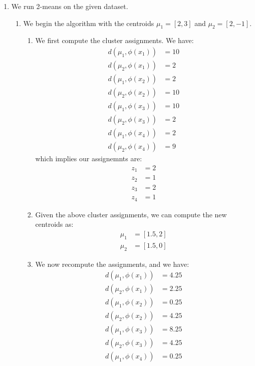 \documentclass[12pt]{article}
\begin{document}
\begin{enumerate}[label=(\alph*)]
  \item We run 2-means on the given dataset.
    \begin{enumerate}
      \item We begin the algorithm with the centroids $\mu_1 = [2,3]$ and $\mu_2 = [2,-1]$.
      \begin{enumerate}[label=(\arabic*)]
        \item We first compute the cluster assignments. We have:
        \begin{align*}
          d(\mu_1, \phi(x_1)) &= 10\\
          d(\mu_2, \phi(x_1)) &= 2 \\
          d(\mu_1, \phi(x_2)) &= 2 \\
          d(\mu_2, \phi(x_2)) &= 10 \\
          d(\mu_1, \phi(x_3)) &= 10\\
          d(\mu_2, \phi(x_3)) &= 2 \\
          d(\mu_1, \phi(x_4)) &= 2 \\
          d(\mu_2, \phi(x_4)) &= 9
        \end{align*}
        which implies our assignemnts are:
        \begin{align*}
          z_1 &= 2 \\
          z_2 &= 1 \\
          z_3 &= 2 \\
          z_4 &= 1
        \end{align*}
      \item Given the above cluster assignments, we can compute the new centroids as:
      \begin{align*}
        \mu_1 &= [1.5, 2] \\
        \mu_2 &= [1.5, 0]
      \end{align*}
      \item We now recompute the assignments, and we have:
      \begin{align*}
        d(\mu_1, \phi(x_1)) &= 4.25\\
        d(\mu_2, \phi(x_1)) &= 2.25 \\
        d(\mu_1, \phi(x_2)) &= 0.25 \\
        d(\mu_2, \phi(x_2)) &= 4.25 \\
        d(\mu_1, \phi(x_3)) &= 8.25 \\
        d(\mu_2, \phi(x_3)) &= 4.25 \\
        d(\mu_1, \phi(x_4)) &= 0.25 \\

\end{align*}
\end{enumerate}
\end{enumerate}
\end{enumerate}
\end{document}
